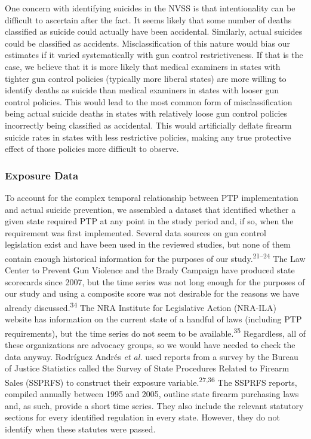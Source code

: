 \documentclass[]{article}
\begin{document}
One concern with identifying suicides in the NVSS is that intentionality
can be difficult to ascertain after the fact. It seems likely that some
number of deaths classified as suicide could actually have been
accidental. Similarly, actual suicides could be classified as accidents.
Misclassification of this nature would bias our estimates if it varied
systematically with gun control restrictiveness. If that is the case, we
believe that it is more likely that medical examiners in states with
tighter gun control policies (typically more liberal states) are more
willing to identify deaths as suicide than medical examiners in states
with looser gun control policies. This would lead to the most common
form of misclassification being actual suicide deaths in states with
relatively loose gun control policies incorrectly being classified as
accidental. This would artificially deflate firearm suicide rates in
states with less restrictive policies, making any true protective effect
of those policies more difficult to observe.

\subsubsection{Exposure Data}\label{exposure-data}

To account for the complex temporal relationship between PTP
implementation and actual suicide prevention, we assembled a dataset
that identified whether a given state required PTP at any point in the
study period and, if so, when the requirement was first implemented.
Several data sources on gun control legislation exist and have been used
in the reviewed studies, but none of them contain enough historical
information for the purposes of our study.\textsuperscript{21--24} The
Law Center to Prevent Gun Violence and the Brady Campaign have produced
state scorecards since 2007, but the time series was not long enough for
the purposes of our study and using a composite score was not desirable
for the reasons we have already discussed.\textsuperscript{34} The NRA
Institute for Legislative Action (NRA-ILA) website has information on
the current state of a handful of laws (including PTP requirements), but
the time series do not seem to be available.\textsuperscript{35}
Regardless, all of these organizations are advocacy groups, so we would
have needed to check the data anyway. Rodríguez Andrés \emph{et al.}
used reports from a survey by the Bureau of Justice Statistics called
the Survey of State Procedures Related to Firearm Sales (SSPRFS) to
construct their exposure variable.\textsuperscript{27,36} The SSPRFS
reports, compiled annually between 1995 and 2005, outline state firearm
purchasing laws and, as such, provide a short time series. They also
include the relevant statutory sections for every identified regulation
in every state. However, they do not identify when these statutes were
passed.
\end{document}
